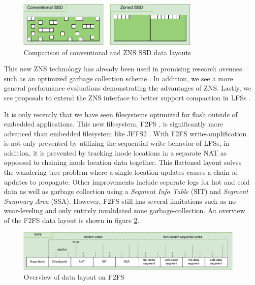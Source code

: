 \begin{figure}[H]
    \centering
	\includegraphics[width=0.8\textwidth]{resources/images/zns-vs-conventional-layout.pdf}
	\caption{Comparison of conventional and ZNS SSD data layouts}
    \label{figure:znslayout}
\end{figure}

This new ZNS technology has already been used in promising research avenues such
as an optimized garbage collection scheme \cite{254268}. In addition, we see
a more general performance evaluations \cite{10.1145/3458336.3465300, 9188086}
demonstrating the advantages of ZNS. Lastly, we see proposals to extend the ZNS
interface to better support compaction in LFSs \cite{273709}.


It is only recently that we have seen filesystems optimized for flash outside of
embedded applications. This new filesystem, F2FS \cite{Lee2015F2FSAN}, is
significantly more advanced than embedded filesystem like JFFS2 \cite{jffs2}.
With F2FS write-amplification is not only prevented by utilizing the sequential
write behavior of LFSs, in addition, it is prevented by tracking inode locations
in a separate NAT as oppossed to chaining inode location data together. This
flattened layout solves the wandering tree problem where a single location
updates causes a chain of updates to propagate. Other improvements include
separate logs for hot and cold data as well as garbage collection using a
\textit{Segment Info Table} (SIT) and \textit{Segment Summary Area} (SSA).
However, F2FS still has several limitations such as no wear-leveling and only
entirely invalidated zone garbage-collection. An overview of the F2FS data
layout is shown in figure \ref{figure:f2fslayout}.

\begin{figure}[H]
    \centering
	\includegraphics[width=1\textwidth]{resources/images/f2fs-layout.png}
	\caption{Overview of data layout on F2FS}
    \label{figure:f2fslayout}
\end{figure}

